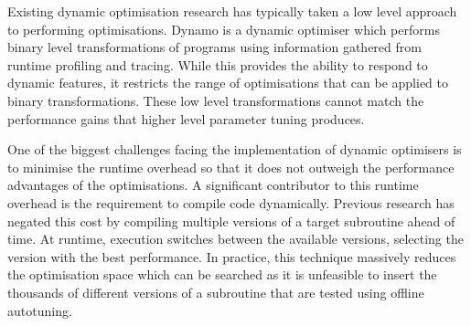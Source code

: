 Existing dynamic optimisation research has typically taken a low level
approach to performing optimisations. Dynamo is a dynamic optimiser
which performs binary level transformations of programs using
information gathered from runtime profiling and tracing. While this
provides the ability to respond to dynamic features, it restricts the
range of optimisations that can be applied to binary
transformations. These low level transformations cannot match the
performance gains that higher level parameter tuning produces.

One of the biggest challenges facing the implementation of dynamic
optimisers is to minimise the runtime overhead so that it does not
outweigh the performance advantages of the optimisations. A
significant contributor to this runtime overhead is the requirement to
compile code dynamically. Previous research has negated this cost by
compiling multiple versions of a target subroutine ahead of time. At
runtime, execution switches between the available versions, selecting
the version with the best performance. In practice, this technique
massively reduces the optimisation space which can be searched as it
is unfeasible to insert the thousands of different versions of a
subroutine that are tested using offline autotuning.
